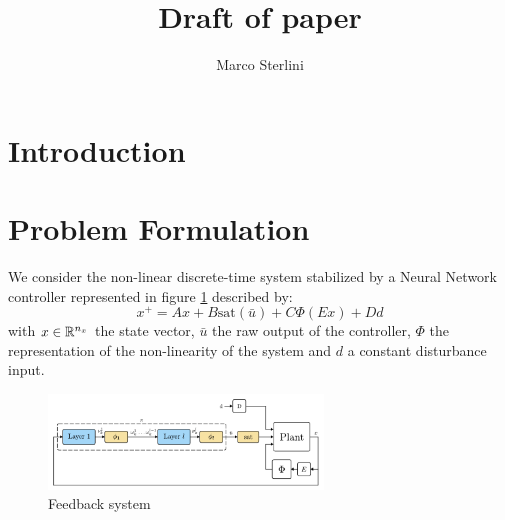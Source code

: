 \documentclass{article}
\begin{document}
\title{Draft of paper}

\author{Marco Sterlini}


\section{Introduction}

\section{Problem Formulation}
We consider the non-linear discrete-time system stabilized by a Neural Network controller represented in figure \ref{fig:first_scheme} described by:
\begin{equation}
  x^{+} = A x + B \text{sat}(\bar{u}) + C \Phi(E x) + D d 
\end{equation}
with $x \in {\mathbb{R}}^{n_x}$ the state vector, $\bar{u}$ the raw output of the controller, $\Phi$ the representation of the non-linearity of the system and $d$ a constant disturbance input.

\begin{figure}[H]
    \centering
    \includegraphics[width=0.65\textwidth]{img/first_scheme}
    \caption{Feedback system}
    \label{fig:first_scheme}
\end{figure}
\end{document}
